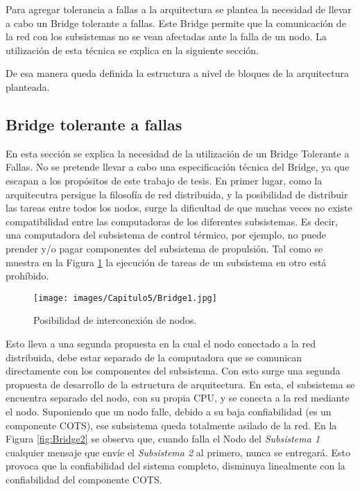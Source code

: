 Para agregar tolerancia a fallas a la arquitectura se plantea la necesidad de 
llevar a cabo un Bridge tolerante a fallas. Este Bridge permite que la comunicación de la red
con los subsistemas no se vean afectadas ante la falla de un nodo. La utilización
de esta técnica se explica en la siguiente sección.

De esa manera queda definida la estructura a nivel de bloques de la arquitectura
planteada. 

\subsection{Bridge tolerante a fallas}\label{subsec:bridge}
En esta sección se explica la necesidad de la utilización de un Bridge 
Tolerante a Fallas. No se pretende llevar a cabo una especificación técnica
del Bridge, ya que escapan a los propósitos de este trabajo de tesis. 
En primer lugar, como la arquitecutra persigue la filosofía de red distribuida, 
y la posibilidad de distribuir las tareas entre todos los nodos, surge la 
dificultad de que muchas veces no existe compatibilidad entre las computadoras 
de los diferentes subsistemas. Es decir, una computadora del subsistema 
de control térmico, por ejemplo, no puede prender y/o pagar componentes del 
subsistema de propulsión. Tal como se muestra en la Figura \ref{fig:Bridge1} la 
ejecución de tareas de un subsistema en otro está prohíbido. 

\begin{figure}[h!]
 \centering
 \texttt{[image: images/Capitulo5/Bridge1.jpg]}
  \caption{Posibilidad de interconexión de nodos.}
\label{fig:Bridge1}
\end{figure} 

Esto lleva a una segunda propuesta en la cual el nodo conectado 
a la red distribuida, debe estar separado de la computadora que 
se comunican directamente con los componentes del subsistema. Con esto
surge una segunda propuesta de desarrollo de la estructura de arquitectura.
En esta, el subsistema se encuentra separado del nodo, con su propia CPU, y se conecta
a la red mediante el nodo. Suponiendo que un nodo falle,
 debido a su baja confiabilidad (es un componente COTS), ese subsistema queda totalmente
asilado de la red. En la Figura \ref{fig:Bridge2} se observa que, cuando falla el Nodo
del \textit{Subsistema 1} cualquier mensaje que envíe el \textit{Subsistema 2} al primero, 
nunca se entregará. Esto provoca que la confiabilidad del sistema completo, disminuya 
linealmente con la confiabilidad del componente COTS. 

